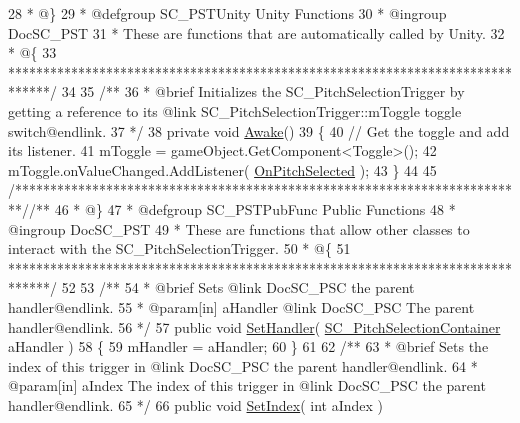 \begin{DoxyCodeInclude}
28 \textcolor{comment}{    * @\}}
29 \textcolor{comment}{    * @defgroup SC\_PSTUnity Unity Functions}
30 \textcolor{comment}{    * @ingroup DocSC\_PST}
31 \textcolor{comment}{    * These are functions that are automatically called by Unity.}
32 \textcolor{comment}{    * @\{}
33 \textcolor{comment}{    ******************************************************************************/}
34 \textcolor{comment}{}
35 \textcolor{comment}{    /**}
36 \textcolor{comment}{     * @brief Initializes the SC\_PitchSelectionTrigger by getting a reference to its @link
       SC\_PitchSelectionTrigger::mToggle toggle switch@endlink.}
37 \textcolor{comment}{    */}
38     \textcolor{keyword}{private} \textcolor{keywordtype}{void} \hyperlink{group___s_c___p_s_t_unity_gafa93dcca78e174eb2de6c4ea83b66a39}{Awake}()
39     \{
40         \textcolor{comment}{// Get the toggle and add its listener.}
41         mToggle = gameObject.GetComponent<Toggle>();
42         mToggle.onValueChanged.AddListener( \hyperlink{group___s_c___p_s_t_handlers_ga5f4ea69eee3ed20cb09d56b7281ce861}{OnPitchSelected} );
43     \}
44 
45     \textcolor{comment}{/*************************************************************************/}\textcolor{comment}{/** }
46 \textcolor{comment}{    * @\}}
47 \textcolor{comment}{    * @defgroup SC\_PSTPubFunc Public Functions}
48 \textcolor{comment}{    * @ingroup DocSC\_PST}
49 \textcolor{comment}{    * These are functions that allow other classes to interact with the SC\_PitchSelectionTrigger.}
50 \textcolor{comment}{    * @\{}
51 \textcolor{comment}{    ******************************************************************************/}
52 \textcolor{comment}{}
53 \textcolor{comment}{    /**}
54 \textcolor{comment}{     * @brief Sets @link DocSC\_PSC the parent handler@endlink.}
55 \textcolor{comment}{     * @param[in] aHandler @link DocSC\_PSC The parent handler@endlink.}
56 \textcolor{comment}{    */}
57     \textcolor{keyword}{public} \textcolor{keywordtype}{void} \hyperlink{group___s_c___p_s_t_pub_func_ga0b334518dbdac5874adf9436cd2c7fed}{SetHandler}( \hyperlink{class_s_c___pitch_selection_container}{SC\_PitchSelectionContainer} aHandler )
58     \{
59         mHandler = aHandler;
60     \}
61 \textcolor{comment}{}
62 \textcolor{comment}{    /**}
63 \textcolor{comment}{     * @brief Sets the index of this trigger in @link DocSC\_PSC the parent handler@endlink.}
64 \textcolor{comment}{     * @param[in] aIndex The index of this trigger in @link DocSC\_PSC the parent handler@endlink.}
65 \textcolor{comment}{    */}
66     \textcolor{keyword}{public} \textcolor{keywordtype}{void} \hyperlink{group___s_c___p_s_t_pub_func_ga0b4edbf9719a384aa5cf8d29d1065696}{SetIndex}( \textcolor{keywordtype}{int} aIndex )

\end{DoxyCodeInclude}

